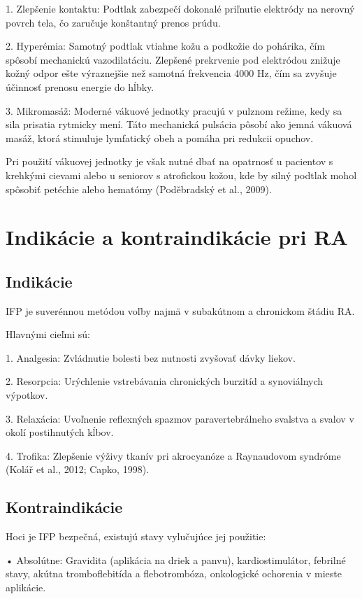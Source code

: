 1. Zlepšenie kontaktu: Podtlak zabezpečí dokonalé priľnutie elektródy na nerovný povrch tela, čo zaručuje konštantný prenos prúdu. 

2. Hyperémia: Samotný podtlak vtiahne kožu a podkožie do pohárika, čím spôsobí mechanickú vazodilatáciu. Zlepšené prekrvenie pod elektródou znižuje kožný odpor ešte výraznejšie než samotná frekvencia 4000 Hz, čím sa zvyšuje účinnosť prenosu energie do hĺbky. 

3. Mikromasáž: Moderné vákuové jednotky pracujú v pulznom režime, kedy sa sila prisatia rytmicky mení. Táto mechanická pulsácia pôsobí ako jemná vákuová masáž, ktorá stimuluje lymfatický obeh a pomáha pri redukcii opuchov. 

Pri použití vákuovej jednotky je však nutné dbať na opatrnosť u pacientov s krehkými cievami alebo u seniorov s atrofickou kožou, kde by silný podtlak mohol spôsobiť petéchie alebo hematómy (Poděbradský et al., 2009). 

\section{Indikácie a kontraindikácie pri RA}

\subsection{Indikácie}

IFP je suverénnou metódou voľby najmä v subakútnom a chronickom štádiu RA. 

Hlavnými cieľmi sú: 

1. Analgesia: Zvládnutie bolesti bez nutnosti zvyšovať dávky liekov. 

2. Resorpcia: Urýchlenie vstrebávania chronických burzitíd a synoviálnych výpotkov. 

3. Relaxácia: Uvoľnenie reflexných spazmov paravertebrálneho svalstva a svalov v okolí postihnutých kĺbov. 

4. Trofika: Zlepšenie výživy tkanív pri akrocyanóze a Raynaudovom syndróme (Kolář et al., 2012; Capko, 1998). 

\subsection{Kontraindikácie}

Hoci je IFP bezpečná, existujú stavy vylučujúce jej použitie: 

• Absolútne: Gravidita (aplikácia na driek a panvu), kardiostimulátor, febrilné stavy, akútna tromboflebitída a flebotrombóza, onkologické ochorenia v mieste aplikácie. 

